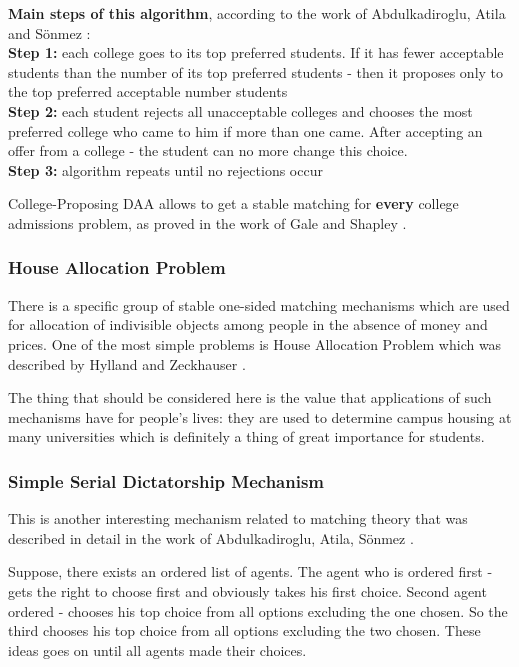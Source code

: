 \documentclass[a4paper]{article} %
\begin{document}
\hfill 
\break
\textbf{Main steps of this algorithm}, according to the work of Abdulkadiroglu, Atila and Sönmez \cite{MainSource}:\\
\textbf{Step 1:} each college goes to its top preferred students. If it has fewer acceptable students than the number of its top preferred students - then it proposes only to the top preferred acceptable number students\\
\textbf{Step 2:} each student rejects all unacceptable colleges and chooses the most preferred college who came to him if more than one came. After accepting an offer from a college - the student can no more change this choice.\\
\textbf{Step 3:} algorithm repeats until no rejections occur

\hfill 
\break
College-Proposing DAA allows to get a stable matching for \textbf{every} college admissions problem, as proved in the work of Gale and Shapley \cite{MilestoneWork}.





\subsubsection{House Allocation Problem}
There is a specific group of stable one-sided matching mechanisms which are used for allocation of indivisible objects among people in the absence of money and prices. One of the most simple problems is House Allocation Problem which was described by Hylland and Zeckhauser \cite{HouseAllocation}.

\hfill
\break
The thing that should be considered here is the value that applications of such mechanisms have for people's lives: they are used to determine campus housing at many universities which is definitely a thing of great importance for students.








\subsubsection{Simple Serial Dictatorship Mechanism}
This is another interesting mechanism related to matching theory that was described in detail in the work of Abdulkadiroglu, Atila, Sönmez \cite{MainSource}.

\hfill
\break
Suppose, there exists an ordered list of agents. The agent who is ordered first - gets the right to choose first and obviously takes his first choice. Second agent ordered - chooses his top choice from all options excluding the one chosen. So the third chooses his top choice from all options excluding the two chosen. These ideas goes on until all agents made their choices.
\end{document}
